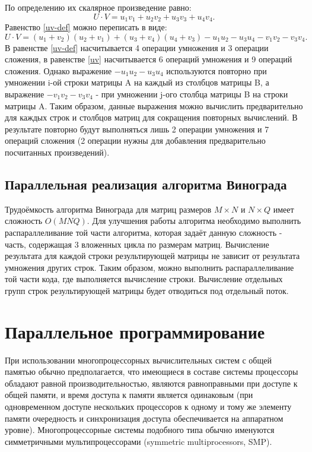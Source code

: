 \documentclass[12pt, a4paper]{report}
\begin{document}
	По определению их скалярное произведение равно:\\
	\begin{equation}
	\label{uv-def}
	U \cdot V = u_{1}v_{1} + u_{2}v_{2} + u_{3}v_{3} + u_{4}v_{4}.
	\end{equation}
	Равенство \ref{uv-def} можно переписать в виде:\\
	\begin{equation}
	\label{uv}
	U \cdot V = (u_{1} + v_{2})(u_{2} + v_{1}) + (u_{3} + v_{4})(u_{4} + v_{3}) - u_{1}u_{2} - u_{3}u_{4} - v_{1}v_{2} - v_{3}v_{4}.
	\end{equation}
	В равенстве \ref{uv-def} насчитывается 4 операции умножения и 3 операции сложения, в равенстве \ref{uv} насчитывается 6 операций умножения и 9 операций сложения. Однако выражение $- u_{1}u_{2} - u_{3}u_{4}$ используются повторно при умножении i-ой строки матрицы A на каждый из столбцов матрицы B, а выражение $- v_{1}v_{2} - v_{3}v_{4}$ - при умножении j-ого столбца матрицы B на строки матрицы A. Таким образом, данные выражения можно вычислить предварительно для каждых строк и столбцов матриц для сокращения повторных вычислений. В результате повторно будут выполняться лишь 2 операции умножения и 7 операций сложения (2 операции нужны для добавления предварительно посчитанных произведений).
	
	\subsection{Параллельная реализация алгоритма Винограда}
	Трудоёмкость алгоритма Винограда для матриц размеров $M \times N$ и $N \times Q$ имеет сложность $O(MNQ)$. Для улучшения работы алгоритма необходимо выполнить распараллеливание той части алгоритма, которая задаёт данную сложность - часть, содержащая 3 вложенных цикла по размерам матриц.
	Вычисление результата для каждой строки результирующей матрицы не зависит от результата умножения других строк. Таким образом, можно выполнить распараллеливание той части кода, где выполняется вычисление строки. Вычисление отдельных групп строк результирующей матрицы будет отводиться под отдельный поток.
	
	\section{Параллельное программирование}
	При использовании многопроцессорных вычислительных систем с общей памятью обычно предполагается, что имеющиеся в составе системы процессоры обладают равной производительностью, являются равноправными при доступе к общей памяти, и время доступа к памяти является одинаковым (при одновременном доступе нескольких процессоров к одному и тому же элементу памяти очередность и синхронизация доступа обеспечивается на аппаратном уровне). Многопроцессорные системы подобного типа обычно именуются симметричными мультипроцессорами (symmetric multiprocessors, SMP).
	
\end{document}
